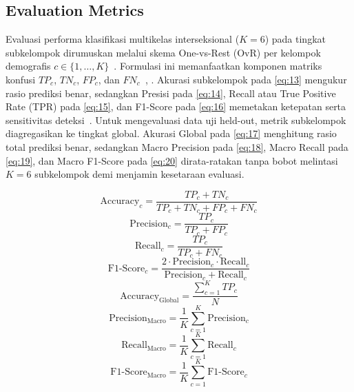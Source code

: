 \subsection{Evaluation Metrics}
\label{sec:evaluation_metrics}

Evaluasi performa klasifikasi multikelas interseksional ($K = 6$) pada tingkat subkelompok dirumuskan melalui skema One-vs-Rest (OvR) per kelompok demografis $c \in \{1, \dots, K\}$~\cite{ref44}. Formulasi ini memanfaatkan komponen matriks konfusi $TP_c$, $TN_c$, $FP_c$, dan $FN_c$~\cite{ref45}, \cite{ref46}. Akurasi subkelompok pada \eqref{eq:13} mengukur rasio prediksi benar, sedangkan Presisi pada \eqref{eq:14}, Recall atau True Positive Rate (TPR) pada \eqref{eq:15}, dan F1-Score pada \eqref{eq:16} memetakan ketepatan serta sensitivitas deteksi~\cite{ref47}. Untuk mengevaluasi data uji held-out, metrik subkelompok diagregasikan ke tingkat global. Akurasi Global pada \eqref{eq:17} menghitung rasio total prediksi benar, sedangkan Macro Precision pada \eqref{eq:18}, Macro Recall pada \eqref{eq:19}, dan Macro F1-Score pada \eqref{eq:20} dirata-ratakan tanpa bobot melintasi $K = 6$ subkelompok demi menjamin kesetaraan evaluasi.

\begin{equation}
\text{Accuracy}_c = \frac{TP_c + TN_c}{TP_c + TN_c + FP_c + FN_c}
\label{eq:13}
\end{equation}
\begin{equation}
\text{Precision}_c = \frac{TP_c}{TP_c + FP_c}
\label{eq:14}
\end{equation}
\begin{equation}
\text{Recall}_c = \frac{TP_c}{TP_c + FN_c}
\label{eq:15}
\end{equation}
\begin{equation}
\text{F1-Score}_c = \frac{2 \cdot \text{Precision}_c \cdot \text{Recall}_c}{\text{Precision}_c + \text{Recall}_c}
\label{eq:16}
\end{equation}
\begin{equation}
\text{Accuracy}_{\text{Global}} = \frac{\sum_{c=1}^K TP_c}{N}
\label{eq:17}
\end{equation}
\begin{equation}
\text{Precision}_{\text{Macro}} = \frac{1}{K} \sum_{c=1}^K \text{Precision}_c
\label{eq:18}
\end{equation}
\begin{equation}
\text{Recall}_{\text{Macro}} = \frac{1}{K} \sum_{c=1}^K \text{Recall}_c
\label{eq:19}
\end{equation}
\begin{equation}
\text{F1-Score}_{\text{Macro}} = \frac{1}{K} \sum_{c=1}^K \text{F1-Score}_c
\label{eq:20}
\end{equation}

